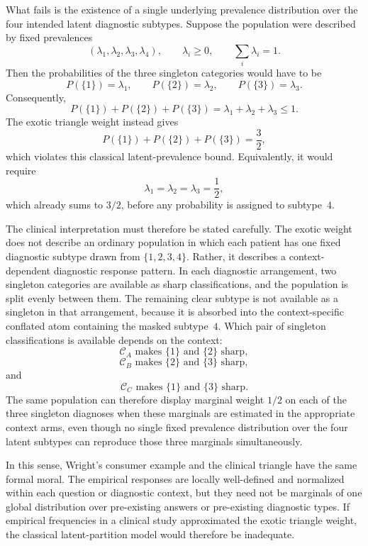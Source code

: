 \documentclass{article}
\begin{document}
What fails is the existence of a single underlying prevalence
distribution over the four intended latent diagnostic subtypes.
Suppose the population were described by fixed prevalences
\[
(\lambda_1,\lambda_2,\lambda_3,\lambda_4),
\qquad
\lambda_i\geq 0,\qquad
\sum_i\lambda_i=1.
\]
Then the probabilities of the three singleton categories would have
to be
\[
P(\{1\})=\lambda_1,\qquad
P(\{2\})=\lambda_2,\qquad
P(\{3\})=\lambda_3.
\]
Consequently,
\[
P(\{1\})+P(\{2\})+P(\{3\})
=
\lambda_1+\lambda_2+\lambda_3
\leq 1.
\]
The exotic triangle weight instead gives
\[
P(\{1\})+P(\{2\})+P(\{3\})
=
\frac32,
\]
which violates this classical latent-prevalence bound. Equivalently,
it would require
\[
\lambda_1=\lambda_2=\lambda_3=\frac12,
\]
which already sums to \(3/2\), before any probability is assigned to
subtype~\(4\).

The clinical interpretation must therefore be stated carefully. The
exotic weight does not describe an ordinary population in which each
patient has one fixed diagnostic subtype drawn from
\(\{1,2,3,4\}\). Rather, it describes a context-dependent diagnostic
response pattern. In each diagnostic arrangement, two singleton
categories are available as sharp classifications, and the population
is split evenly between them. The remaining clear subtype is not
available as a singleton in that arrangement, because it is absorbed
into the context-specific conflated atom containing the masked
subtype~\(4\). Which pair of singleton classifications is available
depends on the context:
\[
\mathcal C_A \text{ makes } \{1\}\text{ and }\{2\}\text{ sharp},
\]
\[
\mathcal C_B \text{ makes } \{2\}\text{ and }\{3\}\text{ sharp},
\]
and
\[
\mathcal C_C \text{ makes } \{1\}\text{ and }\{3\}\text{ sharp}.
\]
The same population can therefore display marginal weight \(1/2\) on
each of the three singleton diagnoses when these marginals are
estimated in the appropriate context arms, even though no single
fixed prevalence distribution over the four latent subtypes can
reproduce those three marginals simultaneously.

In this sense, Wright's consumer example and the clinical triangle
have the same formal moral. The empirical responses are locally
well-defined and normalized within each question or diagnostic
context, but they need not be marginals of one global distribution
over pre-existing answers or pre-existing diagnostic types. If
empirical frequencies in a clinical study approximated the exotic
triangle weight, the classical latent-partition model would therefore
be inadequate.
\end{document}
